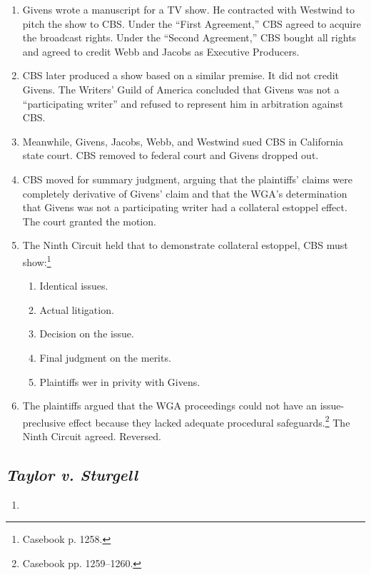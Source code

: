 \begin{enumerate}
    \item Givens wrote a manuscript for a TV show. He contracted with 
    Westwind to pitch the show to CBS. Under the ``First Agreement,'' CBS 
    agreed to acquire the broadcast rights. Under the ``Second Agreement,'' 
    CBS bought all rights and agreed to credit Webb and Jacobs as Executive 
    Producers.
    \item CBS later produced a show based on a similar premise. It did not 
    credit Givens. The Writers' Guild of America concluded that Givens was not 
    a ``participating writer'' and refused to represent him in arbitration 
    against CBS.
    \item Meanwhile, Givens, Jacobs, Webb, and Westwind sued CBS in California state 
    court. CBS removed to federal court and Givens dropped out.
    \item CBS moved for summary judgment, arguing that the plaintiffs' claims 
    were completely derivative of Givens' claim and that the WGA's 
    determination that Givens was not a participating writer had a collateral 
    estoppel effect. The court granted the motion.
    \item The Ninth Circuit held that to demonstrate collateral estoppel, CBS 
    must show:\footnote{Casebook p. 1258.}
    \begin{enumerate}
        \item Identical issues.
        \item Actual litigation.
        \item Decision on the issue.
        \item Final judgment on the merits.
        \item Plaintiffs wer in privity with Givens.
    \end{enumerate}
    \item The plaintiffs argued that the WGA proceedings could not have an 
    issue-preclusive effect because they lacked adequate procedural 
    safeguards.\footnote{Casebook pp. 1259--1260.} The Ninth Circuit agreed. 
    Reversed.
\end{enumerate}

\subsection{\emph{Taylor v. Sturgell}}

\begin{enumerate}
    \item %
\end{enumerate}

